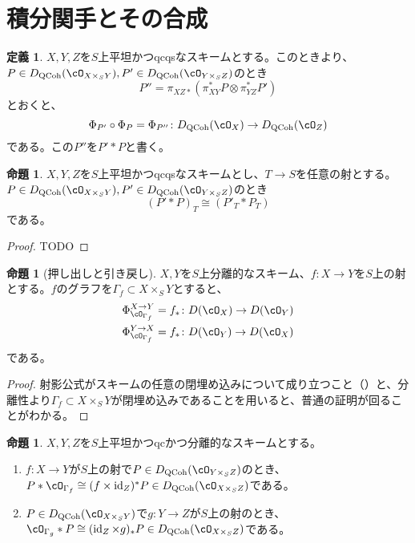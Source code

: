 \documentclass[uplatex, a4paper, dvipdfmx]{jsarticle}
\theoremstyle{definition}
\newtheorem{definition}[theorem]{定義}
\newtheorem{proposition}[theorem]{命題}
\DeclareMathOperator{\id}{\mathrm{id}}
\DeclareMathOperator{\QCoh}{\mathrm{QCoh}}
\begin{document}
\section{積分関手とその合成}
\begin{definition}
    $X, Y, Z$を$S$上平坦かつqcqsなスキームとする。このとき{\cite[\href{https://stacks.math.columbia.edu/tag/0FYS}{Tag 0FYS}]{stacks-project}}より、$P \in D_{\QCoh}(\cO_{X \times_S Y}), P' \in D_{\QCoh}(\cO_{Y \times_S Z})$のとき
    \begin{equation}
        P'' = \pi_{XZ*}(\pi_{XY}^*P \otimes \pi_{YZ}^*P')
    \end{equation}
    とおくと、
    \begin{equation}
        \Phi_{P'} \circ \Phi_P = \Phi_{P''}\colon D_{\QCoh}(\cO_X) \to D_{\QCoh}(\cO_Z)
    \end{equation}
    である。この$P''$を$P' * P$と書く。
\end{definition}
\begin{proposition}
    $X, Y, Z$を$S$上平坦かつqcqsなスキームとし、$T \to S$を任意の射とする。$P \in D_{\QCoh}(\cO_{X \times_S Y}), P' \in D_{\QCoh}(\cO_{Y \times_S Z})$のとき
    \begin{equation}
        (P' * P)_T \cong (P'_T * P_T)
    \end{equation}
    である。
\end{proposition}
\begin{proof}
    TODO
\end{proof}
\begin{proposition}[押し出しと引き戻し]\label{ex:push-pull-as-integral-functor}
    $X, Y$を$S$上分離的なスキーム、$f \colon X \to Y$を$S$上の射とする。$f$のグラフを$\Gamma_f \subset X \times_S Y$とすると、
    \begin{align}
        \Phi_{\cO_{\Gamma_f}}^{X \to Y} = f_* & \colon D(\cO_X) \to D(\cO_Y) \\
        \Phi_{\cO_{\Gamma_f}}^{Y \to X} = f_* & \colon D(\cO_Y) \to D(\cO_X)
    \end{align}
    である。
\end{proposition}
\begin{proof}
    射影公式がスキームの任意の閉埋め込みについて成り立つこと（{\cite[\href{https://stacks.math.columbia.edu/tag/08EU}{Tag 08EU}]{stacks-project}}）と、分離性より$\Gamma_f \subset X \times_S Y$が閉埋め込みであることを用いると、普通の証明が回ることがわかる。
\end{proof}
\begin{proposition}
    $X, Y, Z$を$S$上平坦かつqcかつ分離的なスキームとする。
    \begin{enumerate}
        \item $f \colon X \to Y$が$S$上の射で$P \in D_{\QCoh}(\cO_{Y \times_S Z})$のとき、$P * \cO_{\Gamma_f} \cong (f \times \id_Z)^*P \in D_{\QCoh}(\cO_{X \times_S Z})$である。
        \item $P \in D_{\QCoh}(\cO_{X \times_S Y})$で$g \colon Y \to Z$が$S$上の射のとき、$\cO_{\Gamma_g} * P \cong (\id_Z \times g)_*P \in D_{\QCoh}(\cO_{X \times_S Z})$である。
    \end{enumerate}
\end{proposition}
\end{document}

